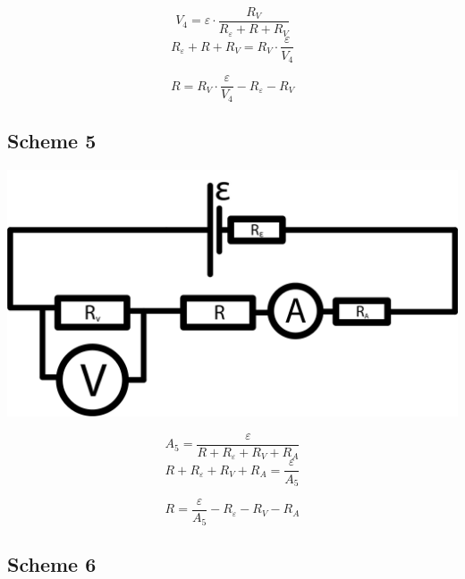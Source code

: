 \documentclass[11pt]{memoir}
\begin{document}
    \begin{equation*}
        V_4 = \varepsilon \cdot \frac{R_V}{R_\varepsilon + R + R_V}
    \end{equation*}
    \begin{equation*}
        R_\varepsilon + R + R_V = R_V \cdot \frac{\varepsilon}{V_4}
    \end{equation*}

    \begin{equation}\label{eq:equation4}
        R = R_V \cdot \frac{\varepsilon}{V_4} - R_\varepsilon - R_V
    \end{equation}


    \newpage

    \subsection{Scheme 5}\label{subsec:scheme-5}

    \includegraphics[width=\linewidth]{../schemes/Scheme5.png}

    \begin{equation*}
        A_5 = \frac{\varepsilon}{R + R_\varepsilon + R_V + R_A}
    \end{equation*}
    \begin{equation*}
        R + R_\varepsilon + R_V + R_A = \frac{\varepsilon}{A_5}
    \end{equation*}

    \begin{equation}\label{eq:equation5}
        R = \frac{\varepsilon}{A_5} - R_\varepsilon - R_V - R_A
    \end{equation}

    \newpage

    \subsection{Scheme 6}\label{subsec:scheme-6}
\end{document}
